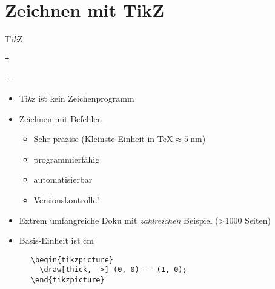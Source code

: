 \section{Zeichnen mit TikZ}

\begin{frame}[fragile]{%
  Ti\textit{k}Z
  \hfill
}
  \begin{Packages}
    \texttt+\usepackage{tikz}+
  \end{Packages}
  \begin{itemize}
    \item \alert{T}i\textit{k}z \alert{i}st \alert{k}ein \alert{Z}eichenprogramm
    \item Zeichnen mit Befehlen
      \begin{itemize}
        \item Sehr präzise (Kleinste Einheit in \TeX ${} \approx \qty{5}{\nano\meter}$)
        \item programmierfähig
        \item automatisierbar
        \item Versionskontrolle!
      \end{itemize}
    \item Extrem umfangreiche Doku mit \emph{zahlreichen} Beispiel (>\num{1000} Seiten)
    \item Basis-Einheit ist \unit{\centi\meter}
  \end{itemize}
  \begin{CodeExample}{0.7}
    \begin{verbatim}
      \begin{tikzpicture}
        \draw[thick, ->] (0, 0) -- (1, 0);
      \end{tikzpicture}
    \end{verbatim}
  \CodeResult
  \strut\\
  \end{CodeExample}
\end{frame}
